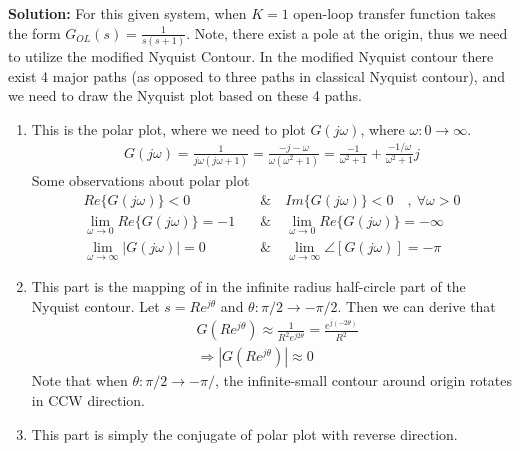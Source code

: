\documentclass{article}
\begin{document}
\vspace{12 pt}

\textbf{Solution:} For this given system, when $K = 1$ open-loop
transfer function takes the form $ G_{OL}(s) = \frac{1}{s (s+1) }$. Note, there exist a pole at the origin, thus 
we need to utilize the modified Nyquist Contour. 
In the modified Nyquist contour there exist 4 major paths (as opposed to three paths in classical Nyquist contour), 
and we need to draw the Nyquist plot based on these 4 paths. 

\begin{enumerate}
  \item This is the polar plot, where we need to plot $G(j \omega)$, where $\omega : 0 \to
    \infty$. 
    \begin{align*}
      G(j \omega) = \frac{1}{j \omega (j \omega +1)} = \frac{ -j  - \omega }{\omega
      (\omega^2 + 1) } = \frac{-1}{\omega^2 + 1} + \frac{-1/\omega}{
      \omega^2 + 1} j
    \end{align*}
%
   Some observations about polar plot
    \begin{align*}
       Re \lbrace G(j \omega) \rbrace < 0 \quad & \&  \quad  Im \lbrace G(j
                                                \omega) \rbrace < 0 \quad , \ \forall  \omega > 0 
      \\
        \lim_{\omega \to 0} Re \lbrace G(j \omega) \rbrace = - 1
       \quad & \& \quad
       \lim_{\omega \to 0} Re \lbrace G(j \omega) \rbrace = - \infty
        \\
       \lim_{\omega \to \infty} | G(j \omega) | = 0
        \quad & \& \quad
      \lim_{\omega \to \infty} \angle [ G(j \omega) ] = -\pi
      \end{align*}
  \item This part is the mapping of in the infinite radius half-circle part of the Nyquist contour.
    Let $s = R e^{j \theta}$ and $\theta : \pi/2 \to -\pi/2$.  Then 
   we can derive that  
   \begin{align*}
     & G \left( R e^{j \theta} \right) \approx \frac{1}{R^2 e^{j
       2 \theta}} = \frac{e^{j (-2 \theta)}}{R^2}
       \\
    &\Rightarrow | G \left( R e^{j \theta} \right) | \approx 0
   \end{align*}
   Note that when $\theta : \pi/2 \to -\pi/$, the infinite-small 
   contour around origin rotates in CCW direction. 
   \item This part is simply the conjugate of polar plot with reverse
     direction. 

\end{enumerate}
\end{document}

